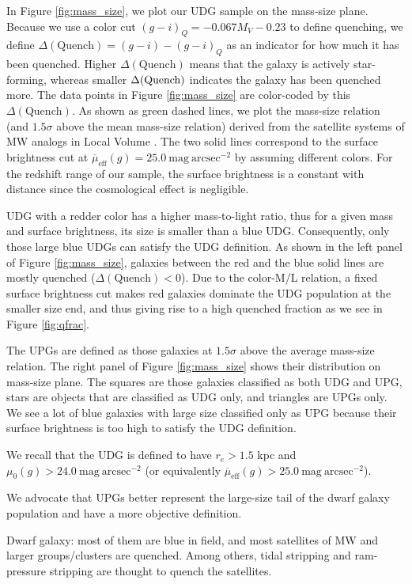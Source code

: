 \documentclass[twocolumn,astrosymb,twocolappendix]{aastex631}
\newcommand{\sbunit}{\mathrm{mag\ arcsec}^{-2}}
\newcommand{\sbeff}{\overline{\mu}_{\mathrm{eff}}(g)}
\begin{document}
\begin{CJK*}{UTF8}{gbsn}
In Figure \ref{fig:mass_size}, we plot our UDG sample on the mass-size plane. Because we use a color cut $(g-i)_{Q} = -0.067 M_V - 0.23$ to define quenching, we define $\Delta(\mathrm{Quench}) = (g-i) - (g-i)_{Q}$ as an indicator for how much it has been quenched. Higher $\Delta(\mathrm{Quench})$ means that the galaxy is actively star-forming, whereas smaller $\Delta(\rm Quench)$ indicates the galaxy has been quenched more. The data points in Figure \ref{fig:mass_size} are color-coded by this $\Delta(\mathrm{Quench})$. As shown as green dashed lines, we plot the mass-size relation (and $1.5\sigma$ above the mean mass-size relation) derived from the satellite systems of MW analogs in Local Volume \citep{ELVES-I}. The two solid lines correspond to the surface brightness cut at $\sbeff = 25.0\ \sbunit$ by assuming different colors. For the redshift range of our sample, the surface brightness is a constant with distance since the cosmological effect is negligible. 

UDG with a redder color has a higher mass-to-light ratio, thus for a given mass and surface brightness, its size is smaller than a blue UDG. Consequently, only those large blue UDGs can satisfy the UDG definition. As shown in the left panel of Figure \ref{fig:mass_size}, galaxies between the red and the blue solid lines are mostly quenched ($\Delta(\mathrm{Quench}) < 0$). Due to the color-M/L relation, a fixed surface brightness cut makes red galaxies dominate the UDG population at the smaller size end, and thus giving rise to a high quenched fraction as we see in Figure \ref{fig:qfrac}. 

The UPGs are defined as those galaxies at $1.5\sigma$ above the average mass-size relation. The right panel of Figure \ref{fig:mass_size} shows their distribution on mass-size plane. The squares are those galaxies classified as both UDG and UPG, stars are objects that are classified as UDG only, and triangles are UPGs only. We see a lot of blue galaxies with large size classified only as UPG because their surface brightness is too high to satisfy the UDG definition. 

We recall that the UDG is defined to have $r_e > 1.5$ kpc and $\mu_0(g) > 24.0\ \sbunit$ (or equivalently $\sbeff > 25.0\ \sbunit$). 

We advocate that UPGs better represent the large-size tail of the dwarf galaxy population and have a more objective definition. 



Dwarf galaxy: most of them are blue in field, and most satellites of MW and larger groups/clusters are quenched. Among others, tidal stripping and ram-pressure stripping are thought to quench the satellites. 


\end{CJK*}
\end{document}
